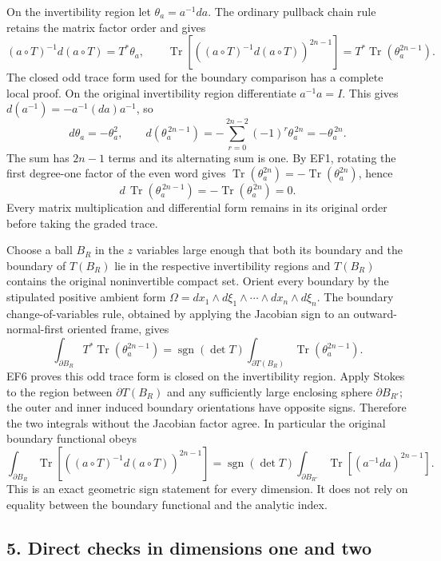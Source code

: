 \documentclass[
  11pt,
]{article}
\begin{document}
On the invertibility region let \(\theta_a=a^{-1}da\). The ordinary
pullback chain rule retains the matrix factor order and gives \[
 (a\circ T)^{-1}d(a\circ T)=T^*\theta_a,\qquad
 \operatorname{Tr}
   [((a\circ T)^{-1}d(a\circ T))^{2n-1}]
   =T^*\operatorname{Tr}(\theta_a^{2n-1}).
 \tag{LS5}
\] The closed odd trace form used for the boundary comparison has a
complete local proof. On the original invertibility region differentiate
\(a^{-1}a=I\). This gives \(d(a^{-1})=-a^{-1}(da)a^{-1}\), so \[
 d\theta_a=-\theta_a^2,\qquad
 d(\theta_a^{\,2n-1})
 =-\sum_{r=0}^{2n-2}(-1)^r\theta_a^{\,2n}
 =-\theta_a^{\,2n}.                                      \tag{EF5}
\] The sum has \(2n-1\) terms and its alternating sum is one. By EF1,
rotating the first degree-one factor of the even word gives
\(\operatorname{Tr}(\theta_a^{2n})=-\operatorname{Tr}(\theta_a^{2n})\),
hence \[
 d\,\operatorname{Tr}(\theta_a^{\,2n-1})
 =-\operatorname{Tr}(\theta_a^{\,2n})=0.                   \tag{EF6}
\] Every matrix multiplication and differential form remains in its
original order before taking the graded trace.

Choose a ball \(B_R\) in the \(z\) variables large enough that both its
boundary and the boundary of \(T(B_R)\) lie in the respective
invertibility regions and \(T(B_R)\) contains the original noninvertible
compact set. Orient every boundary by the stipulated positive ambient
form \(\Omega=dx_1\wedge d\xi_1\wedge\cdots\wedge dx_n\wedge d\xi_n\).
The boundary change-of-variables rule, obtained by applying the Jacobian
sign to an outward-normal-first oriented frame, gives \[
 \int_{\partial B_R}
       T^*\operatorname{Tr}(\theta_a^{2n-1})
 =\operatorname{sgn}(\det T)
       \int_{\partial T(B_R)}
             \operatorname{Tr}(\theta_a^{2n-1}).
 \tag{LS6}
\] EF6 proves this odd trace form is closed on the invertibility region.
Apply Stokes to the region between \(\partial T(B_R)\) and any
sufficiently large enclosing sphere \(\partial B_{R'}\); the outer and
inner induced boundary orientations have opposite signs. Therefore the
two integrals without the Jacobian factor agree. In particular the
original boundary functional obeys \[
 \int_{\partial B_R}
   \operatorname{Tr}
     [((a\circ T)^{-1}d(a\circ T))^{2n-1}]
 =\operatorname{sgn}(\det T)
       \int_{\partial B_{R'}}
             \operatorname{Tr}[(a^{-1}da)^{2n-1}] .
 \tag{LS7}
\] This is an exact geometric sign statement for every dimension. It
does not rely on equality between the boundary functional and the
analytic index.

\subsection{5. Direct checks in dimensions one and
two}\label{direct-checks-in-dimensions-one-and-two}
\end{document}
